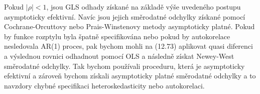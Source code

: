 Pokud $|\rho| < 1$, jsou GLS odhady získané na základě výše uvedeného postupu asymptoticky efektivní. Navíc jsou jejich směrodatné odchylky získané pomocí Cochrane-Orcuttovy nebo Prais-Winstenovy metody asymptoticky platné. Pokud by funkce rozptylu byla špatně specifikována nebo pokud by autokorelace nesledovala AR(1) proces, pak bychom mohli na (12.73) aplikovat quasi diferenci a výslednou rovnici odhadnout pomocí OLS a následně získat Newey-West směrodatné odchylky. Tak bychom používali proceduru, která je asymptoticky efektivní a zároveň bychom získali asymptoticky platné směrodatné odchylky a to navzdory chybné specifikaci heteroskedasticity nebo autokorelaci.